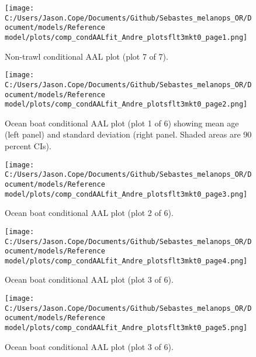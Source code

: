\documentclass[11pt,
  letterpaper,
]{article}
\begin{document}
\begin{figure}
{\centering
\texttt{[image: C:/Users/Jason.Cope/Documents/Github/Sebastes\_melanops\_OR/Document/models/Reference model/plots/comp\_condAALfit\_Andre\_plotsflt3mkt0\_page1.png]}
}
\caption{Non-trawl conditional AAL plot (plot 7 of 7).\label{fig:comp_condAALfit_Andre_plotsflt3mkt0_page1}}
\end{figure}

\begin{figure}
{\centering
\texttt{[image: C:/Users/Jason.Cope/Documents/Github/Sebastes\_melanops\_OR/Document/models/Reference model/plots/comp\_condAALfit\_Andre\_plotsflt3mkt0\_page2.png]}
}
\caption{Ocean boat conditional AAL plot (plot 1 of 6) showing mean age (left panel) and standard deviation (right panel. Shaded areas are 90 percent CIs).\label{fig:comp_condAALfit_Andre_plotsflt3mkt0_page2}}
\end{figure}

\begin{figure}
{\centering
\texttt{[image: C:/Users/Jason.Cope/Documents/Github/Sebastes\_melanops\_OR/Document/models/Reference model/plots/comp\_condAALfit\_Andre\_plotsflt3mkt0\_page3.png]}
}
\caption{Ocean boat conditional AAL plot (plot 2 of 6).\label{fig:comp_condAALfit_Andre_plotsflt3mkt0_page3}}
\end{figure}

\begin{figure}
{\centering
\texttt{[image: C:/Users/Jason.Cope/Documents/Github/Sebastes\_melanops\_OR/Document/models/Reference model/plots/comp\_condAALfit\_Andre\_plotsflt3mkt0\_page4.png]}
}
\caption{Ocean boat conditional AAL plot (plot 3 of 6).\label{fig:comp_condAALfit_Andre_plotsflt3mkt0_page4}}
\end{figure}

\begin{figure}
{\centering
\texttt{[image: C:/Users/Jason.Cope/Documents/Github/Sebastes\_melanops\_OR/Document/models/Reference model/plots/comp\_condAALfit\_Andre\_plotsflt3mkt0\_page5.png]}
}
\caption{Ocean boat conditional AAL plot (plot 3 of 6).\label{fig:comp_condAALfit_Andre_plotsflt3mkt0_page5}}
\end{figure}
\end{document}
